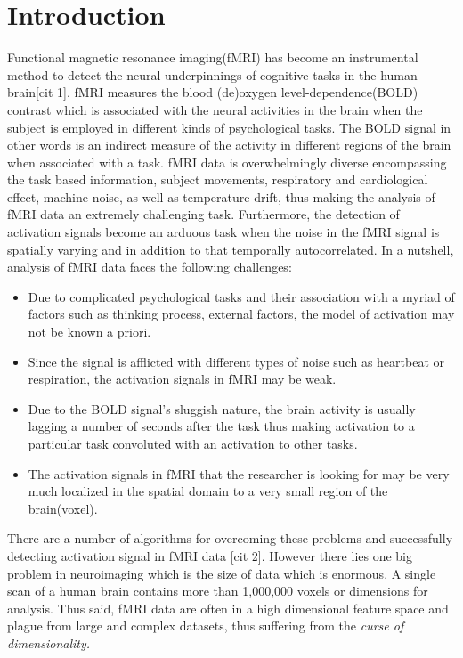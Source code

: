 \documentclass[11pt]{article}
\begin{document}
\section{Introduction}

Functional magnetic resonance imaging(fMRI) has become an instrumental method to detect the neural underpinnings of cognitive tasks in the human brain[cit 1]. fMRI measures the blood (de)oxygen level-dependence(BOLD) contrast which is associated with the neural activities in the brain when the subject is employed in different kinds of psychological tasks. The BOLD signal in other words is an indirect measure of the activity in different regions of the brain when associated with a task. fMRI data is overwhelmingly diverse encompassing the task based information, subject movements, respiratory and cardiological effect, machine noise, as well as temperature drift, thus making the analysis of fMRI data an extremely challenging task. Furthermore, the detection of activation signals become an arduous task when the noise in the fMRI signal is spatially varying and in addition to that temporally autocorrelated. In a nutshell, analysis of fMRI data faces the following challenges:
\newpage
\begin{itemize}
    \item Due to complicated psychological tasks and their association with a myriad of factors such as thinking process, external factors, the model of activation may not be known a priori.
    
    \item Since the signal is afflicted with different types of noise such as heartbeat or respiration, the activation signals in fMRI may be weak.
    \item Due to the BOLD signal's sluggish nature, the brain activity is usually lagging a number of seconds after the task thus making activation to a particular task convoluted with an activation to other tasks.
    \item The activation signals in fMRI that the researcher is looking for may be very much localized in the spatial domain to a very small region of the brain(voxel).
\end{itemize}

There are a number of algorithms for overcoming these problems and successfully detecting activation signal in fMRI data [cit 2]. However there lies one big problem in neuroimaging which is the size of data which is enormous. A single scan of a human brain contains more than 1,000,000 voxels or dimensions for analysis. Thus said, fMRI data are often in a high dimensional feature space and plague from large and complex datasets, thus suffering from the \textit{curse of dimensionality.}\\
\end{document}

